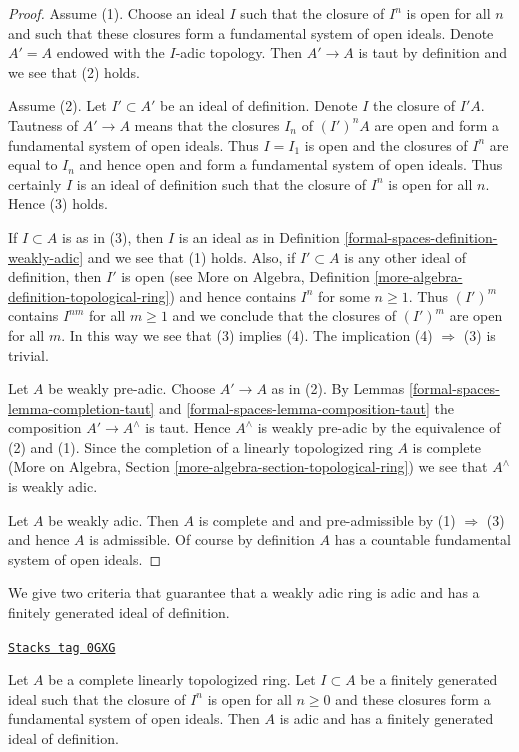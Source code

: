 \begin{proof}
Assume (1). Choose an ideal $I$ such that the closure
of $I^n$ is open for all $n$ and such that these closures form
a fundamental system of open ideals. Denote $A' = A$ endowed with
the $I$-adic topology. Then $A' \to A$ is taut by definition and
we see that (2) holds.

\medskip\noindent
Assume (2). Let $I' \subset A'$ be an ideal of definition.
Denote $I$ the closure of $I'A$. Tautness of $A' \to A$ means
that the closures $I_n$ of $(I')^nA$ are open and form a fundamental system of
open ideals. Thus $I = I_1$ is open and the closures of $I^n$
are equal to $I_n$ and hence open and form a fundamental system of
open ideals. Thus certainly $I$ is an ideal of definition
such that the closure of $I^n$ is open for all $n$. Hence (3) holds.

\medskip\noindent
If $I \subset A$ is as in (3), then $I$ is an ideal as in
Definition \ref{formal-spaces-definition-weakly-adic} and we see that (1) holds.
Also, if $I' \subset A$ is any other ideal of definition, then
$I'$ is open (see More on Algebra, Definition
\ref{more-algebra-definition-topological-ring})
and hence contains $I^n$ for some $n \geq 1$.
Thus $(I')^m$ contains $I^{nm}$ for all $m \geq 1$ and we
conclude that the closures of $(I')^m$ are open for all $m$.
In this way we see that (3) implies (4).
The implication (4) $\Rightarrow$ (3) is trivial.

\medskip\noindent
Let $A$ be weakly pre-adic. Choose $A' \to A$ as in (2).
By Lemmas \ref{formal-spaces-lemma-completion-taut} and
\ref{formal-spaces-lemma-composition-taut}
the composition $A' \to A^\wedge$ is taut. Hence $A^\wedge$
is weakly pre-adic by the equivalence of (2) and (1).
Since the completion of a linearly topologized ring $A$ is complete
(More on Algebra, Section \ref{more-algebra-section-topological-ring})
we see that $A^\wedge$ is weakly adic.

\medskip\noindent
Let $A$ be weakly adic. Then $A$ is complete and
and pre-admissible by (1) $\Rightarrow$ (3) and hence $A$
is admissible. Of course by definition $A$ has a countable
fundamental system of open ideals.
\end{proof}

We give two criteria that guarantee that a weakly adic ring
is adic and has a finitely generated ideal of definition.

\begin{lemma}
\label{formal-spaces-lemma-weakly-adic-finite-generation-bis}
\href{https://stacks.math.columbia.edu/tag/0GXG}{\texttt{Stacks tag 0GXG}}

Let $A$ be a complete linearly topologized ring. Let $I \subset A$ be a
finitely generated ideal such that the closure of $I^n$ is open for all
$n \geq 0$ and these closures form a fundamental system of open ideals.
Then $A$ is adic and has a finitely generated ideal of definition.
\end{lemma}

